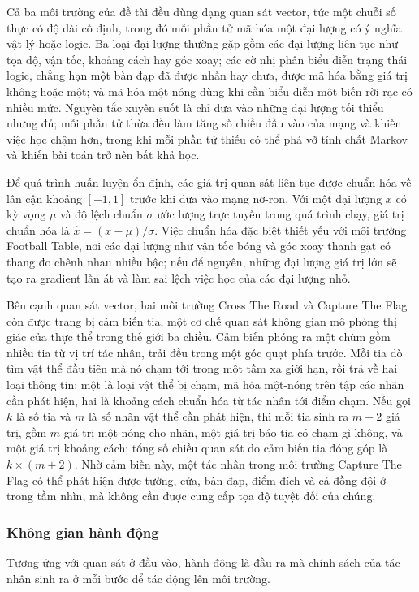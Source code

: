 \indent Cả ba môi trường của đề tài đều dùng dạng quan sát vector, tức một chuỗi
số thực có độ dài cố định, trong đó mỗi phần tử mã hóa một đại lượng có ý nghĩa vật lý
hoặc logic. Ba loại đại lượng thường gặp gồm các đại lượng liên tục như tọa độ, vận
tốc, khoảng cách hay góc xoay; các cờ nhị phân biểu diễn trạng thái logic, chẳng hạn một
bàn đạp đã được nhấn hay chưa, được mã hóa bằng giá trị không hoặc một; và mã hóa
một-nóng dùng khi cần biểu diễn một biến rời rạc có nhiều mức. Nguyên tắc xuyên suốt là chỉ đưa vào những đại lượng
tối thiểu nhưng đủ; mỗi phần tử thừa đều làm tăng số chiều đầu vào của mạng và khiến
việc học chậm hơn, trong khi mỗi phần tử thiếu có thể phá vỡ tính chất Markov và khiến
bài toán trở nên bất khả học.

\indent Để quá trình huấn luyện ổn định, các giá trị quan sát liên tục được
chuẩn hóa về lân cận khoảng $[-1, 1]$ trước khi đưa vào mạng nơ-ron. Với một
đại lượng $x$ có kỳ vọng $\mu$ và độ lệch chuẩn $\sigma$ ước lượng trực tuyến trong
quá trình chạy, giá trị chuẩn hóa là $\hat{x} = (x - \mu)/\sigma$. Việc chuẩn hóa đặc
biệt thiết yếu với môi trường Football Table, nơi các đại lượng như vận tốc bóng và
góc xoay thanh gạt có thang đo chênh nhau nhiều bậc; nếu để nguyên, những đại lượng
giá trị lớn sẽ tạo ra gradient lấn át và làm sai lệch việc học của các đại lượng nhỏ.

\indent Bên cạnh quan sát vector, hai môi trường Cross The Road và Capture The Flag
còn được trang bị cảm biến tia, một cơ chế quan sát không gian mô phỏng thị
giác của thực thể trong thế giới ba chiều. Cảm biến phóng ra một chùm gồm nhiều tia từ
vị trí tác nhân, trải đều trong một góc quạt phía trước. Mỗi tia dò tìm vật thể đầu
tiên mà nó chạm tới trong một tầm xa giới hạn, rồi trả về hai loại thông tin: một là
loại vật thể bị chạm, mã hóa một-nóng trên tập các nhãn cần phát hiện, hai là khoảng
cách chuẩn hóa từ tác nhân tới điểm chạm. Nếu gọi $k$ là số tia và $m$ là số nhãn vật
thể cần phát hiện, thì mỗi tia sinh ra $m + 2$ giá trị, gồm $m$ giá trị một-nóng cho
nhãn, một giá trị báo tia có chạm gì không, và một giá trị khoảng cách; tổng số chiều
quan sát do cảm biến tia đóng góp là $k \times (m + 2)$. Nhờ cảm biến này, một tác nhân
trong môi trường Capture The Flag có thể phát hiện được tường, cửa, bàn đạp, điểm đích
và cả đồng đội ở trong tầm nhìn, mà không cần được cung cấp tọa độ tuyệt đối của chúng.

\subsubsection{Không gian hành động}
\label{sub:action-space}
\indent Tương ứng với quan sát ở đầu vào, hành động là đầu ra mà chính sách của tác
nhân sinh ra ở mỗi bước để tác động lên môi trường.

